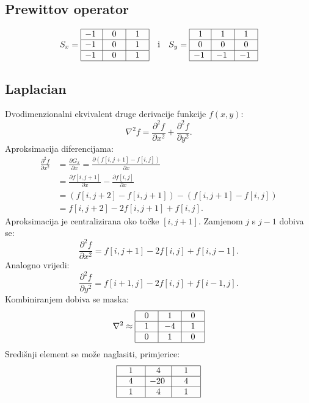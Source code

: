 \documentclass[11pt,english]{article}
\begin{document}
\subsection{Prewittov operator}
$$S_x =
\begin{array}{|c|c|c|}
\hline
-1\; & \;~0~\; & \;~1~\;\\ \hline
-1\; & \;0\; & \;1\;\\ \hline
-1\; & \;0\; & \;1\;\\ \hline
\end{array}
\quad \text{i} \quad
S_y =
\begin{array}{|c|c|c|}
\hline
~1\; & \;~1~\; & \;~1~\;\\ \hline
0 & 0 & 0\\ \hline
-1\; & -1\; & -1\;\\ \hline
\end{array}$$

\subsection{Laplacian}
Dvodimenzionalni ekvivalent druge derivacije funkcije $f(x,y)$:
$$\nabla^2 f = \frac{\partial^2f}{\partial x^2} + \frac{\partial^2f}{\partial y^2}.$$
Aproksimacija diferencijama:
\begin{align*}
\frac{\partial^2f}{\partial x^2} &= \frac{\partial G_x}{\partial x} = \frac{\partial ( f[i,j+1]-f[i,j])}{\partial x}\\
&=\frac{\partial f[i,j+1]}{\partial x}-\frac{\partial f[i,j]}{\partial x}\\
&=\left ( f[i,j+2]-f[i,j+1]\right ) - \left ( f[i,j+1]-f[i,j]\right )\\
&=f[i,j+2]-2f[i,j+1]+f[i,j].
\end{align*}
Aproksimacija je centralizirana oko točke $[i,j+1]$. Zamjenom $j$ s $j-1$ dobiva se:
$$\frac{\partial^2 f}{\partial x^2} = f[i,j+1]-2f[i,j]+f[i,j-1].$$
Analogno vrijedi:
$$\frac{\partial^2 f}{\partial y^2} = f[i+1,j]-2f[i,j]+f[i-1,j].$$
Kombiniranjem dobiva se maska:
$$\nabla^2 \approx
\begin{array}{|c|c|c|}
\hline
\;~0~\; & \;~1~\; & \;~0~\;\\ \hline
1 & -4& 1\\ \hline
0 & 1 & 0\\ \hline
\end{array}$$
Središnji element se može naglasiti, primjerice:
$$\begin{array}{|c|c|c|}
\hline
\;~~1~~\; & 4 & \;~~1~~\;\\ \hline
4 &-20\;& 4\\ \hline
1 & 4 & 1\\ \hline
\end{array}$$
\end{document}
